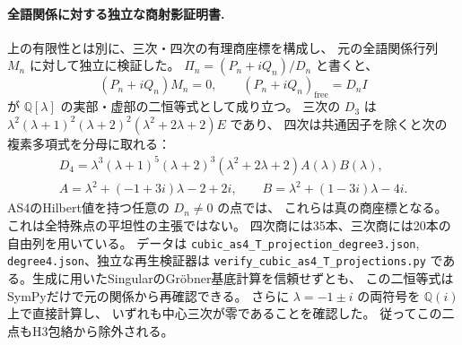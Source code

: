 \paragraph{全語関係に対する独立な商射影証明書.}
上の有限性とは別に、三次・四次の有理商座標を構成し、
元の全語関係行列 $M_n$ に対して独立に検証した。
$\Pi_n=(P_n+iQ_n)/D_n$ と書くと、
\[
 (P_n+iQ_n)M_n=0,\qquad
 (P_n+iQ_n)_{\mathrm{free}}=D_n I
\]
が $\mathbb Q[\lambda]$ の実部・虚部の二恒等式として成り立つ。
三次の $D_3$ は
$\lambda^2(\lambda+1)^2(\lambda+2)^2(\lambda^2+2\lambda+2)E$ であり、
四次は共通因子を除くと次の複素多項式を分母に取れる：
\[
\begin{gathered}
 D_4=\lambda^3(\lambda+1)^5(\lambda+2)^3
 (\lambda^2+2\lambda+2)A(\lambda)B(\lambda),\\
 A=\lambda^2+(-1+3i)\lambda-2+2i,\qquad
 B=\lambda^2+(1-3i)\lambda-4i.
\end{gathered}
\]
AS4のHilbert値を持つ任意の $D_n\ne0$ の点では、
これらは真の商座標となる。これは全特殊点の平坦性の主張ではない。
四次商には35本、三次商には20本の自由列を用いている。
データは
\texttt{cubic\_\allowbreak{}as4\_\allowbreak{}T\_\allowbreak{}projection\_\allowbreak{}degree3.json},
\texttt{degree4.json}、独立な再生検証器は
\texttt{verify\_\allowbreak{}cubic\_\allowbreak{}as4\_\allowbreak{}T\_\allowbreak{}projections.py}
である。生成に用いたSingularのGr\"obner基底計算を信頼せずとも、
この二恒等式はSymPyだけで元の関係から再確認できる。
さらに $\lambda=-1\pm i$ の両符号を $\mathbb Q(i)$ 上で直接計算し、
いずれも中心三次が零であることを確認した。
従ってこの二点もH3包絡から除外される。

